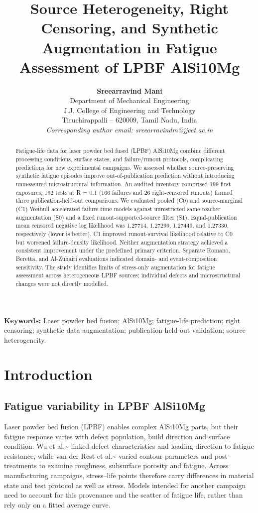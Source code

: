 \documentclass[12pt,a4paper]{article}
\title{Source Heterogeneity, Right Censoring, and Synthetic Augmentation in Fatigue Assessment of LPBF AlSi10Mg}
\author{\textbf{Sreearravind Mani}\\[3pt]
\small Department of Mechanical Engineering\\
\small J.J. College of Engineering and Technology\\
\small Tiruchirappalli -- 620009, Tamil Nadu, India\\[3pt]
\small \textit{Corresponding author email: sreearravindm@jjcet.ac.in}}
\date{}
\begin{document}
\maketitle
\linenumbers



\begin{abstract}
Fatigue-life data for laser powder bed fused (LPBF) AlSi10Mg combine different processing conditions, surface states, and failure/runout protocols, complicating predictions for new experimental campaigns. We assessed whether source-preserving synthetic fatigue episodes improve out-of-publication prediction without introducing unmeasured microstructural information. An audited inventory comprised 199 first exposures; 192 tests at R = 0.1 (166 failures and 26 right-censored runouts) formed three publication-held-out comparisons. We evaluated pooled (C0) and source-marginal (C1) Weibull accelerated failure time models against unrestricted same-teacher augmentation (S0) and a fixed runout-supported-source filter (S1). Equal-publication mean censored negative log likelihood was 1.27714, 1.27299, 1.27449, and 1.27330, respectively (lower is better). C1 improved runout-survival likelihood relative to C0 but worsened failure-density likelihood. Neither augmentation strategy achieved a consistent improvement under the predefined primary criterion. Separate Romano, Beretta, and Al-Zuhairi evaluations indicated domain- and event-composition sensitivity. The study identifies limits of stress-only augmentation for fatigue assessment across heterogeneous LPBF sources; individual defects and microstructural changes were not directly modelled.
\end{abstract}
\noindent\textbf{Keywords:} Laser powder bed fusion; AlSi10Mg; fatigue-life prediction; right censoring; synthetic data augmentation; publication-held-out validation; source heterogeneity.\par
\section{Introduction}

\subsection{Fatigue variability in LPBF AlSi10Mg}

Laser powder bed fusion (LPBF) enables complex AlSi10Mg parts, but their fatigue response varies with defect population, build direction and surface condition. Wu et al.\textasciitilde{}\cite{wu2021} linked defect characteristics and loading direction to fatigue resistance, while van der Rest et al.\textasciitilde{}\cite{vanderrest2025} varied contour parameters and post-treatments to examine roughness, subsurface porosity and fatigue. Across manufacturing campaigns, stress–life points therefore carry differences in material state and test protocol as well as stress. Models intended for another campaign need to account for this provenance and the scatter of fatigue life, rather than rely only on a fitted average curve.
\end{document}
